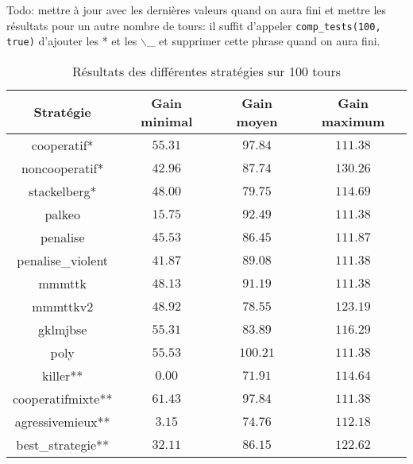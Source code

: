 \documentclass{scrartcl}
\begin{document}
    Todo: mettre à jour avec les dernières valeurs quand on aura fini et mettre
    les résultats pour un autre nombre de tours: il suffit d'appeler
    \verb+comp_tests(100, true)+ d'ajouter les * et les $\backslash$\_ et
    supprimer cette phrase quand on aura fini.
    \begin{table}[f]
      \centering
      \begin{tabular}{|c||c|c|c|}
        \hline
        Stratégie      & Gain minimal & Gain moyen & Gain maximum \\\hline\hline
           cooperatif* & $ 55.31$ & $ 97.84$ & $111.38$ \\\hline
        noncooperatif* & $ 42.96$ & $ 87.74$ & $130.26$ \\\hline
          stackelberg* & $ 48.00$ & $ 79.75$ & $114.69$ \\\hline
                palkeo & $ 15.75$ & $ 92.49$ & $111.38$ \\\hline
              penalise & $ 45.53$ & $ 86.45$ & $111.87$ \\\hline
     penalise\_violent & $ 41.87$ & $ 89.08$ & $111.38$ \\\hline
                mmmttk & $ 48.13$ & $ 91.19$ & $111.38$ \\\hline
              mmmttkv2 & $ 48.92$ & $ 78.55$ & $123.19$ \\\hline
              gklmjbse & $ 55.31$ & $ 83.89$ & $116.29$ \\\hline
                  poly & $ 55.53$ & $100.21$ & $111.38$ \\\hline
              killer** & $  0.00$ & $ 71.91$ & $114.64$ \\\hline
     cooperatifmixte** & $ 61.43$ & $ 97.84$ & $111.38$ \\\hline
      agressivemieux** & $  3.15$ & $ 74.76$ & $112.18$ \\\hline
     best\_strategie** & $ 32.11$ & $ 86.15$ & $122.62$ \\\hline
      \end{tabular}
      \caption{Résultats des différentes stratégies sur 100 tours}
      \label{table:coop_results}
    \end{table}
\end{document}
